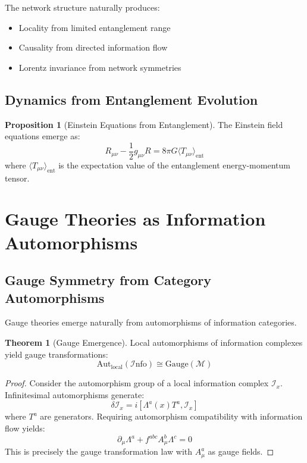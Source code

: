 \documentclass[11pt,a4paper]{article}
\theoremstyle{definition}
\newtheorem{theorem}{Theorem}[section]
\newtheorem{proposition}{Proposition}[section]
\newcommand{\Info}{\mathcal{I}\text{nfo}}
\begin{document}
The network structure naturally produces:
\begin{itemize}
\item Locality from limited entanglement range
\item Causality from directed information flow
\item Lorentz invariance from network symmetries
\end{itemize}

\subsection{Dynamics from Entanglement Evolution}

\begin{proposition}[Einstein Equations from Entanglement]
The Einstein field equations emerge as:
\begin{equation}
R_{\mu\nu} - \frac{1}{2}g_{\mu\nu}R = 8\pi G \langle T_{\mu\nu}\rangle_{\text{ent}}
\end{equation}
where $\langle T_{\mu\nu}\rangle_{\text{ent}}$ is the expectation value of the entanglement energy-momentum tensor.
\end{proposition}

\section{Gauge Theories as Information Automorphisms}

\subsection{Gauge Symmetry from Category Automorphisms}

Gauge theories emerge naturally from automorphisms of information categories.

\begin{theorem}[Gauge Emergence]
Local automorphisms of information complexes yield gauge transformations:
\begin{equation}
\text{Aut}_{\text{local}}(\Info) \cong \text{Gauge}(\mathcal{M})
\end{equation}
\end{theorem}

\begin{proof}
Consider the automorphism group of a local information complex $\mathcal{I}_x$. Infinitesimal automorphisms generate:
\[\delta\mathcal{I}_x = i[\Lambda^a(x)T^a, \mathcal{I}_x]\]
where $T^a$ are generators. Requiring automorphism compatibility with information flow yields:
\[\partial_\mu \Lambda^a + f^{abc}A_\mu^b\Lambda^c = 0\]
This is precisely the gauge transformation law with $A_\mu^a$ as gauge fields.
\end{proof}
\end{document}
